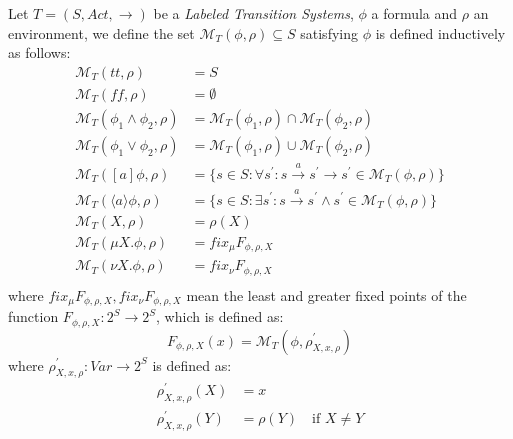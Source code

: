 Let $T = (S, Act, \rightarrow)$ be a \emph{Labeled Transition
  Systems}, $\phi$ a formula and $\rho$ an environment, we define the
set $\mathcal{M}_T(\phi, \rho) \subseteq S$ satisfying $\phi$ is
defined inductively as follows:
\begin{displaymath}
  \begin{split}
    \mathcal{M}_T(tt, \rho) &= S \\
    \mathcal{M}_T(ff, \rho) &= \emptyset \\
    \mathcal{M}_T(\phi_1 \wedge \phi_2, \rho) &=
    \mathcal{M}_T(\phi_1, \rho) \cap     \mathcal{M}_T(\phi_2, \rho)\\
    \mathcal{M}_T(\phi_1 \vee \phi_2, \rho) &=
    \mathcal{M}_T(\phi_1, \rho) \cup     \mathcal{M}_T(\phi_2, \rho)\\
    \mathcal{M}_T([a]\phi, \rho) &= \{ s\in S: \forall s^{\prime}: s
    \xrightarrow{a} s^{\prime} \rightarrow s^{\prime} \in
    \mathcal{M}_T(\phi, \rho)\} \\
    \mathcal{M}_T(\langle a \rangle \phi, \rho) &= \{ s\in S: \exists
    s^{\prime}: s \xrightarrow{a} s^{\prime} \wedge s^{\prime} \in
    \mathcal{M}_T(\phi, \rho)\} \\
    \mathcal{M}_T(X, \rho) &= \rho(X) \\
    \mathcal{M}_T(\mu X.\phi, \rho) &= fix_{\mu}F_{\phi, \rho, X} \\
    \mathcal{M}_T(\nu X.\phi, \rho) &= fix_{\nu}F_{\phi, \rho, X} \\
  \end{split}
\end{displaymath}
where $fix_{\mu}F_{\phi, \rho, X}, fix_{\nu}F_{\phi, \rho, X}$ mean
the least and greater fixed points of the function $F_{\phi, \rho, X}:
2^S \rightarrow 2^S$, which is defined as:
\begin{displaymath}
  F_{\phi, \rho, X}(x) = \mathcal{M}_T(\phi, \rho_{X, x, \rho}^{\prime})
\end{displaymath}
where $\rho_{X, x, \rho}^{\prime}: Var \rightarrow 2^S$ is defined as:
\begin{displaymath}
  \begin{split}
    \rho_{X, x, \rho}^{\prime}(X) &= x \\
    \rho_{X, x, \rho}^{\prime}(Y) &= \rho(Y) \quad \text{if } X\not=Y\\
  \end{split}
\end{displaymath}

